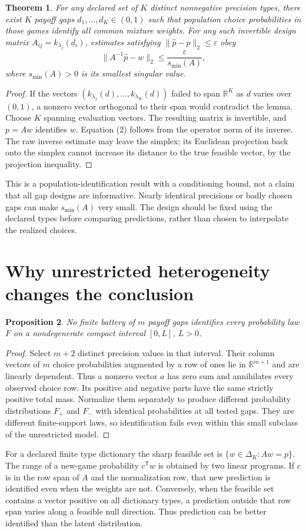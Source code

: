 \documentclass[11pt]{article}
\newtheorem{theorem}{Theorem}
\newtheorem{proposition}[theorem]{Proposition}
\theoremstyle{definition}
\begin{document}
\begin{theorem}
For any declared set of $K$ distinct nonnegative precision types, there
exist $K$ payoff gaps $d_1,\ldots,d_K\in(0,1)$ such that population
choice probabilities in those games identify all common mixture weights.
For any such invertible design matrix $A_{ij}=k_{\lambda_j}(d_i)$,
estimates satisfying $\|\widehat p-p\|_2\le\varepsilon$ obey
\[
 \|A^{-1}\widehat p-w\|_2\le
 \frac{\varepsilon}{s_{\min}(A)},                         \tag{2}
\]
where $s_{\min}(A)>0$ is its smallest singular value.
\end{theorem}
\begin{proof}
If the vectors $(k_{\lambda_1}(d),\ldots,k_{\lambda_K}(d))$
failed to span $\mathbb R^K$ as $d$ varies over $(0,1)$, a nonzero
vector orthogonal to their span would contradict the lemma. Choose
$K$ spanning evaluation vectors. The resulting matrix is invertible,
and $p=Aw$ identifies $w$. Equation (2) follows from the operator norm
of its inverse. The raw inverse estimate may leave the simplex; its
Euclidean projection back onto the simplex cannot increase its distance
to the true feasible vector, by the projection inequality.
\end{proof}
This is a population-identification result with a conditioning bound,
not a claim that all gap designs are informative. Nearly identical
precisions or badly chosen gaps can make $s_{\min}(A)$ very small.
The design should be fixed using the declared types before comparing
predictions, rather than chosen to interpolate the realized choices.

\section*{Why unrestricted heterogeneity changes the conclusion}
\begin{proposition}
No finite battery of $m$ payoff gaps identifies every probability law
$F$ on a nondegenerate compact interval $[0,L]$, $L>0$.
\end{proposition}
\begin{proof}
Select $m+2$ distinct precision values in that interval. Their column
vectors of $m$ choice probabilities augmented by a row of ones lie
in $\mathbb R^{m+1}$ and are linearly dependent. Thus a nonzero vector
$a$ has zero sum and annihilates every observed choice row. Its positive
and negative parts have the same strictly positive total mass. Normalize
them separately to produce different probability distributions $F_+$
and $F_-$ with identical probabilities at all tested gaps. They are
different finite-support laws, so identification fails even within this
small subclass of the unrestricted model.
\end{proof}
For a declared finite type dictionary the sharp feasible set is
$\{w\in\Delta_K:Aw=p\}$. The range of a new-game probability
$c^{\mathsf T}w$ is obtained by two linear programs. If $c$ is in the
row span of $A$ and the normalization row, that new prediction is
identified even when the weights are not. Conversely, when the feasible
set contains a vector positive on all dictionary types, a prediction
outside that row span varies along a feasible null direction. Thus
prediction can be better identified than the latent distribution.
\end{document}
